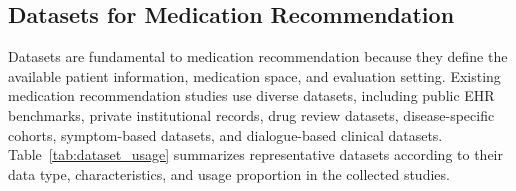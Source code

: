 \documentclass[manuscript,review]{acmart}
\begin{document}


\subsection{Datasets for Medication Recommendation}

Datasets are fundamental to medication recommendation because they define the available patient information, medication space, and evaluation setting. Existing medication recommendation studies use diverse datasets, including public EHR benchmarks, private institutional records, drug review datasets, disease-specific cohorts, symptom-based datasets, and dialogue-based clinical datasets. Table~\ref{tab:dataset_usage} summarizes representative datasets according to their data type, characteristics, and usage proportion in the collected studies.
\end{document}
